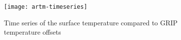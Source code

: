 \begin{figure}[ht]
  \centering
  \texttt{[image: artm-timeseries]}
  \caption{Time series of the surface temperature compared to GRIP temperature offsets}
  \label{fig:artm-timeseries}
\end{figure}

\begin{comment}
  FIXME: Variable acab in following is worth looking at. It looks right and it
  may be possible to compare to other paleo-limate studies:
\begin{verbatim}
$ pclimate -i green20km_y1.nc -o bar.nc -ys -125000.0 -ye -0.0 -dt 1000.0 \
           -dTforcing grip_dT.nc -dSLforcing specmap_dSL.nc \
           -atmosphere eismint_greenland,dTforcing -surface pdd -ocean constant,dSLforcing
\end{verbatim}%
\end{comment}


